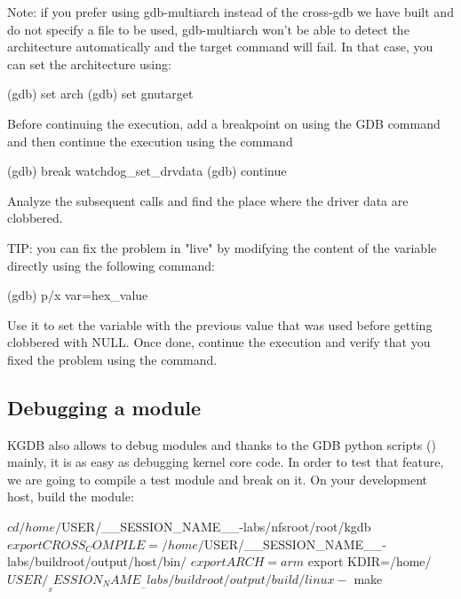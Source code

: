 Note: if you prefer using gdb-multiarch instead of the cross-gdb we have
built and do not specify a file to be used, gdb-multiarch won't be able to
detect the architecture automatically and the target command will fail. In
that case, you can set the architecture using:

\begin{bashinput}
(gdb) set arch %
(gdb) set gnutarget %
\end{bashinput}

Before continuing the execution, add a breakpoint on
 using the  GDB command and then
continue the execution using the  command

\begin{bashinput}
(gdb) break watchdog_set_drvdata
(gdb) continue
\end{bashinput}

Analyze the subsequent calls and find the place where the driver data are
clobbered.

TIP: you can fix the problem in "live" by modifying the content of the
 variable directly using the following command:

\begin{bashinput}
(gdb) p/x var=hex_value
\end{bashinput}

Use it to set the variable with the previous value that was used before getting
clobbered with NULL. Once done, continue the execution and verify that you fixed
the problem using the  command.


\subsection{Debugging a module}

KGDB also allows to debug modules and thanks to the GDB python scripts
() mainly, it is as easy as debugging kernel core code. In
order to test that feature, we are going to compile a test module and break on
it. On your development host, build the module:

\begin{bashinput}
$ cd /home/$USER/__SESSION_NAME__-labs/nfsroot/root/kgdb
$ export CROSS_COMPILE=/home/$USER/__SESSION_NAME__-labs/buildroot/output/host/bin/%
$ export ARCH=arm
$ export KDIR=/home/$USER/__SESSION_NAME__-labs/buildroot/output/build/linux-%
$ make
\end{bashinput}

